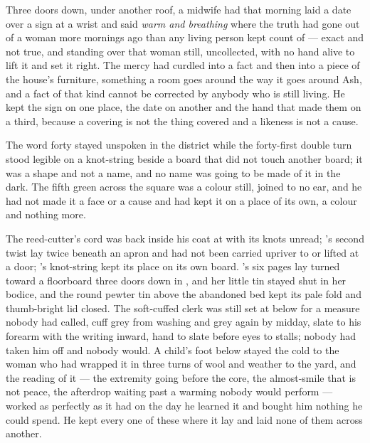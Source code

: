 Three doors down, under another roof, a midwife had that morning laid a date over a sign at a wrist and said \emph{warm and breathing} where the truth had gone out of a woman more mornings ago than any living person kept count of --- exact and not true, and standing over that woman still, uncollected, with no hand alive to lift it and set it right. The mercy had curdled into a fact and then into a piece of the house's furniture, something a room goes around the way it goes around Ash, and a fact of that kind cannot be corrected by anybody who is still living. He kept the sign on one place, the date on another and the hand that made them on a third, because a covering is not the thing covered and a likeness is not a cause.

The word forty stayed unspoken in the district while the forty-first double turn stood legible on a knot-string beside a board that did not touch another board; it was a shape and not a name, and no name was going to be made of it in the dark. The fifth green across the square was a colour still, joined to no ear, and he had not made it a face or a cause and had kept it on a place of its own, a colour and nothing more.

The reed-cutter's cord was back inside his coat at  with its knots unread; 's second twist lay twice beneath an apron and had not been carried upriver to  or lifted at a door; 's knot-string kept its place on its own board. 's six pages lay turned toward a floorboard three doors down in , and her little tin stayed shut in her bodice, and the round pewter tin above the abandoned bed kept its pale fold and thumb-bright lid closed. The soft-cuffed clerk was still set at  below  for a measure nobody had called, cuff grey from washing and grey again by midday, slate to his forearm with the writing inward, hand to slate before eyes to stalls; nobody had taken him off and nobody would. A child's foot below  stayed the cold to the woman who had wrapped it in three turns of wool and weather to the yard, and the reading of it --- the extremity going before the core, the almost-smile that is not peace, the afterdrop waiting past a warming nobody would perform --- worked as perfectly as it had on the day he learned it and bought him nothing he could spend. He kept every one of these where it lay and laid none of them across another.

